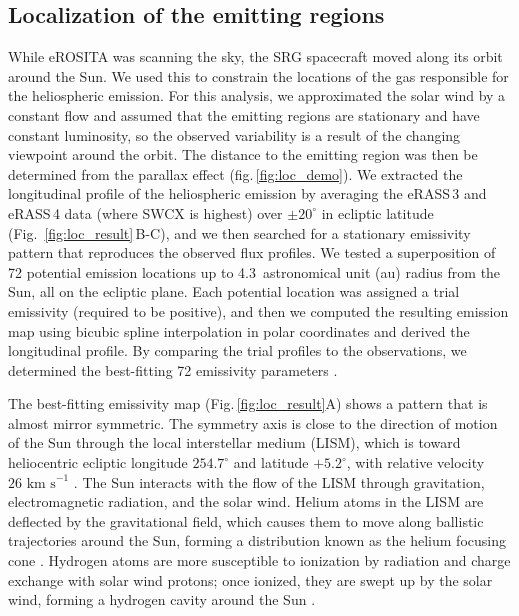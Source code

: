 \documentclass[12pt]{article}
\renewcommand{\deg}{^{\circ}}
\newcommand{\erass}{eRASS\,}
\begin{document}
\subsection*{Localization of the emitting regions}

While eROSITA was scanning the sky, the SRG spacecraft moved along its orbit around the Sun. We used this to constrain the locations of the gas responsible for the heliospheric emission. For this analysis, we approximated the solar wind by a constant flow \cite{methods} and assumed that the emitting regions are stationary and have constant luminosity, so the observed variability is a result of the changing viewpoint around the orbit. The distance to the emitting region was then be determined from the parallax effect (fig.\,\ref{fig:loc_demo}). We extracted the longitudinal profile of the heliospheric emission by averaging the \erass3 and \erass4 data (where SWCX is highest) over $\pm20\deg$ in ecliptic latitude (Fig.~\ref{fig:loc_result}\,B-C), and we then searched for a stationary emissivity pattern that reproduces the observed flux profiles. We tested a superposition of 72 potential emission locations up to 4.3~astronomical unit (au) radius from the Sun, all on the ecliptic plane. Each potential location was assigned a trial emissivity (required to be positive), and then we computed the resulting emission map using bicubic spline interpolation in polar coordinates and derived the longitudinal profile. By comparing the trial profiles to the observations, we determined the best-fitting 72 emissivity parameters \cite{methods}.

The best-fitting emissivity map (Fig.\,\ref{fig:loc_result}A) shows a pattern that is almost mirror symmetric. The symmetry axis is close to the direction of motion of the Sun through the local interstellar medium (LISM), which is toward heliocentric ecliptic longitude $254.7\deg$ and latitude $+5.2\deg$, with relative velocity $26\mbox{ km s}^{-1}$ \cite{lal05b}. The Sun interacts with the flow of the LISM through gravitation, electromagnetic radiation, and the solar wind. Helium atoms in the LISM are deflected by the gravitational field, which causes them to move along ballistic trajectories around the Sun, forming a distribution known as the helium focusing cone \cite{wel74a,lal04a}. Hydrogen atoms are more susceptible to ionization by radiation and charge exchange with solar wind protons; once ionized, they are swept up by the solar wind, forming a hydrogen cavity around the Sun \cite{ber71a,tho71a}.
\end{document}
